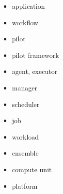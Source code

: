 \documentclass{sig-alternate}
\begin{document}
\begin{itemize}
	\item application
	\item workflow
        \item pilot
        \item pilot framework
        \item agent, executor
	\item manager
        \item scheduler
	\item job
        \item workload
	\item ensemble
    \item compute unit
	\item platform
\end{itemize}
\end{document}
